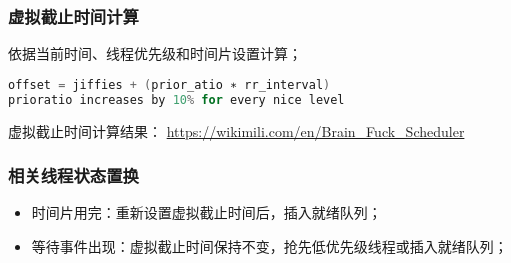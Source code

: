 % 
% 
% 
% 
% 
% 
\begin{frame}[fragile]
    \frametitle{虚拟截止时间计算}

依据当前时间、线程优先级和时间片设置计算；

    \begin{lstlisting}[language = C]
offset = jiffies + (prior_atio ∗ rr_interval)
prioratio increases by 10% for every nice level
    \end{lstlisting}

\pause
虚拟截止时间计算结果： \href{https://wikimili.com/en/Brain_Fuck_Scheduler}{https://wikimili.com/en/Brain\_Fuck\_Scheduler}
\end{frame}
% 
% 
% 
\begin{frame}[fragile]
    \frametitle{相关线程状态置换}
    \begin{itemize}
        \item 时间片用完：重新设置虚拟截止时间后，插入就绪队列；
        \item 等待事件出现：虚拟截止时间保持不变，抢先低优先级线程或插入就绪队列；
    \end{itemize}

\end{frame}
% 
% 
% 
